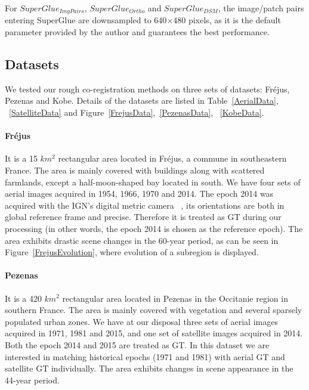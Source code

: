 For $SuperGlue_{ImgPairs}$, $SuperGlue_{Ortho}$ and $SuperGlue_{DSM}$, the image/patch pairs entering SuperGlue are downsampled to 640$\times$480 pixels, as it is the default parameter provided by the author and guarantees the best performance. 


\subsection{Datasets}
\label{Datasets}
We tested our rough co-registration methods on three sets of datasets: Fr{\'e}jus, Pezenas and Kobe. Details of the datasets are listed in Table~\ref{AerialData}, ~\ref{SatelliteData} and Figure~\ref{FrejusData},~\ref{PezenasData}, ~\ref{KobeData}.
\par
\paragraph{Fr{\'e}jus} It is a 15 $km^2$ rectangular area located in Fr{\'e}jus, a commune in southeastern France. The area is mainly covered with buildings along with scattered farmlands, except a half-moon-shaped bay located in south. We have four sets of aerial images acquired in 1954, 1966, 1970 and 2014. The epoch 2014 was acquired with the \ac{IGN}'s digital metric camera ~\cite{souchon2010ign}, its orientations are both in global reference frame and precise. Therefore it is treated as \ac{GT} during our processing (in other words, the epoch 2014 is chosen as the reference epoch). 
The area exhibits drastic scene changes in the 60-year period, as can be seen in Figure~\ref{FrejusEvolution}, where evolution of a subregion is displayed.\\
\paragraph{Pezenas} It is a 420 $km^2$ rectangular area located in Pezenas in the Occitanie region in southern France. The area is mainly covered with vegetation and several sparsely populated urban zones. We have at our disposal three sets of aerial images acquired in 1971, 1981 and 2015, and one set of satellite images acquired in 2014. Both the epoch 2014 and 2015 are treated as \ac{GT}. In this dataset we are interested in matching historical epochs (1971 and 1981) with aerial \ac{GT} and satellite \ac{GT} individually. The area exhibits changes in scene appearance in the 44-year period.\\
